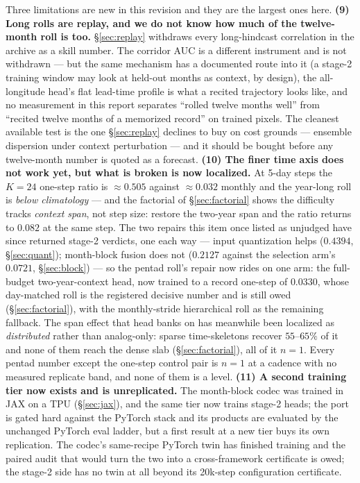 \documentclass[10pt]{article}
\begin{document}
Three limitations are new in this revision and they are the largest ones
here. \textbf{(9) Long rolls are replay, and we do not know how much of the
twelve-month roll is too.} \S\ref{sec:replay} withdraws every
long-hindcast correlation in the archive as a skill number. The corridor
AUC is a different instrument and is not withdrawn --- but the same
mechanism has a documented route into it (a stage-2 training window may
look at held-out months as context, by design), the all-longitude head's
flat lead-time profile is what a recited trajectory looks like, and no
measurement in this report separates ``rolled twelve months well'' from
``recited twelve months of a memorized record'' on trained pixels. The
cleanest available test is the one \S\ref{sec:replay} declines to buy on
cost grounds --- ensemble dispersion under context perturbation --- and it
should be bought before any twelve-month number is quoted as a forecast.
\textbf{(10) The finer time axis does not work yet, but what is broken is
now localized.} At 5-day steps the $K{=}24$ one-step ratio is
$\approx0.505$ against $\approx0.032$ monthly and the year-long roll is
\emph{below climatology} --- and the factorial of \S\ref{sec:factorial}
shows the difficulty tracks \emph{context span}, not step size: restore
the two-year span and the ratio returns to $0.082$ at the same step. The
two repairs this item once listed as unjudged have since returned
stage-2 verdicts, one each way --- input quantization helps ($0.4394$,
\S\ref{sec:quant}); month-block fusion does not ($0.2127$ against the
selection arm's $0.0721$, \S\ref{sec:block}) --- so the pentad roll's
repair now rides on one arm: the full-budget two-year-context head,
now trained to a record one-step of $0.0330$, whose day-matched roll
is the registered decisive number and is still owed
(\S\ref{sec:factorial}), with the monthly-stride hierarchical roll as
the remaining fallback. The span effect that head banks on has
meanwhile been localized as \emph{distributed} rather than analog-only:
sparse time-skeletons recover $55$--$65\%$ of it and none of them reach
the dense slab (\S\ref{sec:factorial}), all of it $n{=}1$. Every pentad number except the one-step control
pair is $n=1$ at a cadence with no measured replicate band, and none of
them is a level. \textbf{(11) A second training tier now exists and is
unreplicated.} The month-block codec was trained in JAX on a TPU
(\S\ref{sec:jax}), and the same tier now trains stage-2 heads; the
port is gated hard against the PyTorch stack and its products are evaluated
by the unchanged PyTorch eval ladder, but a first result at a new tier buys
its own replication. The codec's same-recipe PyTorch twin has finished
training and the paired audit that would turn the two into a
cross-framework certificate is owed; the stage-2 side has no twin at all
beyond its 20k-step configuration certificate.
\end{document}
